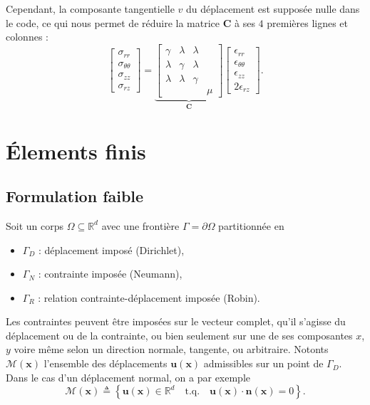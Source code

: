 \documentclass[12pt]{article}
\newcommand{\uu}{\mathbf{u}}
\newcommand{\xx}{\mathbf{x}}
\begin{document}
Cependant, la composante tangentielle $v$ du déplacement est 
supposée nulle dans le code, ce qui nous permet de réduire la matrice 
$\mathbf{C}$ à ses $4$ premières lignes et colonnes :
\begin{equation}
    \begin{bmatrix}
        \sigma_{rr}\\
        \sigma_{\theta\theta}\\
        \sigma_{zz}\\
        \sigma_{rz}
    \end{bmatrix} = 
    \underbrace{
    \begin{bmatrix}
        \gamma & \lambda & \lambda &  \\
        \lambda & \gamma & \lambda &  \\
        \lambda & \lambda & \gamma &  \\
         &  &  & \mu 
    \end{bmatrix}}_{\mathbf{C}}
    \begin{bmatrix}
        \epsilon_{rr}\\
        \epsilon_{\theta\theta}\\
        \epsilon_{zz}\\
        2\epsilon_{rz}
    \end{bmatrix}.
\end{equation}

\newpage
\section{Élements finis}

\subsection{Formulation faible}
Soit un corps $\Omega \subseteq \mathbb{R}^d$ avec une frontière $\Gamma =
\partial \Omega$ partitionnée en 
\begin{itemize}
    \setlength{\itemsep}{0pt}
    \item $\Gamma_D$ : déplacement imposé (Dirichlet),
    \item $\Gamma_N$ : contrainte imposée (Neumann),
    \item $\Gamma_R$ : relation contrainte-déplacement imposée (Robin).
\end{itemize}

Les contraintes peuvent être imposées sur le vecteur complet, qu’il s’agisse 
du déplacement ou de la contrainte, ou bien seulement sur une de ses 
composantes $x$, $y$ voire même selon un direction normale, tangente, 
ou arbitraire.
Notonts $\mathcal{M}(\xx)$ l'ensemble des déplacements $\uu(\xx)$ admissibles 
sur un point de $\Gamma_D$. Dans le cas d'un déplacement normal, on a par 
exemple
\begin{equation}
    \mathcal{M}(\xx) \triangleq \left\{ \uu(\xx) \in \mathbb{R}^d \quad 
        \text{t.q.} \quad \uu(\xx) \cdot \mathbf{n}(\xx) = 0\right\}.
\end{equation}
\end{document}
